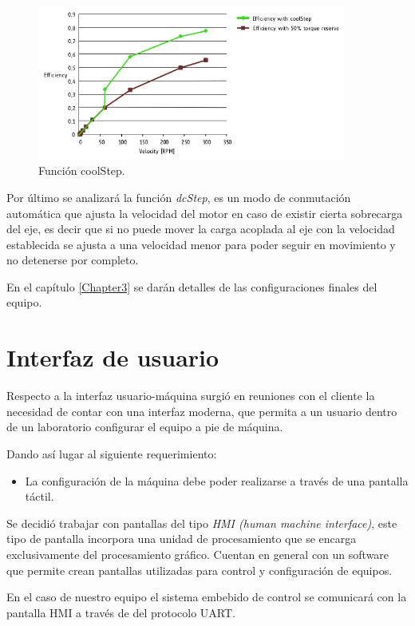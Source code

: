 \begin{figure}[htpb]
\centering 
\includegraphics[width=0.9\textwidth]{./Figures/tmc5130_coolstep.png}
\caption{Función coolStep.}
\label{fig:tmc5130_coolStep}
\end{figure}

Por último se analizará la función \textit{dcStep}, es un modo de conmutación automática que ajusta la velocidad del motor en caso de existir cierta sobrecarga del eje, es decir que si no puede mover la carga acoplada al eje con la velocidad establecida se ajusta a una velocidad menor para poder seguir en movimiento y no detenerse por completo. 


En el capítulo \ref{Chapter3} se darán detalles de las configuraciones finales del equipo.

\section{Interfaz de usuario}

Respecto a la interfaz usuario-máquina surgió en reuniones con el cliente la necesidad de contar con una interfaz moderna, que permita a un usuario dentro de un laboratorio configurar el equipo a pie de máquina. 

Dando así lugar al siguiente requerimiento:
\begin{itemize}
\item La configuración de la máquina debe poder realizarse a través de una pantalla táctil.	
\end{itemize} 

Se decidió trabajar con pantallas del tipo \textit{HMI (human machine interface)}, este tipo de pantalla incorpora una unidad de procesamiento que se encarga exclusivamente del procesamiento gráfico. Cuentan en general con un software que permite crean pantallas utilizadas para control y configuración de equipos. 

En el caso de nuestro equipo el sistema embebido de control se comunicará con la pantalla HMI a través de del protocolo UART. 

